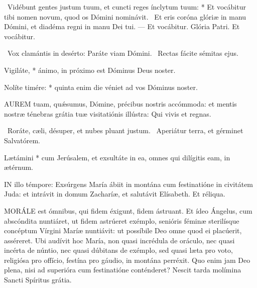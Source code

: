 \R\ Vidébunt gentes justum tuum, et cuncti reges ínclytum tuum: * Et vocábitur tibi nomen novum, quod os Dómini nominávit. \V\ Et eris coróna glóriæ in manu Dómini, et diadéma regni in manu Dei tui. --- Et vocábitur. Glória Patri. Et vocábitur.

\V\ Vox clamántis in desérto: Paráte viam Dómini. \R\ Rectas fácite sémitas ejus.

 Vigiláte, * ánimo, in próximo est Dóminus Deus noster.


 Nolíte timére: * quinta enim die véniet ad vos Dóminus noster.



\lettrine[lines=2]{A}{UREM} tuam, quǽsumus, Dómine, précibus nostris accómmoda: et mentis nostræ ténebras grátia tuæ visitatiónis illústra: Qui vivis et regnas.

\V\ Roráte, cæli, désuper, et nubes pluant justum. \R\ Aperiátur terra, et gérminet Salvatórem.

 Lætámini * cum Jerúsalem, et exsultáte in ea, omnes qui dilígitis eam, in ætérnum.


\sectionornament





\lettrine[lines=2]{I}{N} illo témpore: Exsúrgens María ábiit in montána cum festinatióne in civitátem Juda: et intrávit in domum Zacharíæ, et salutávit Elísabeth. Et réliqua.



\lettrine[lines=2]{M}{ORÁLE} est ómnibus, qui fidem éxigunt, fidem ástruant. Et ídeo Ángelus, cum abscóndita nuntiáret, ut fidem astrúeret exémplo, senióris féminæ sterilísque concéptum Vírgini Maríæ nuntiávit: ut possíbile Deo omne quod ei placúerit, asséreret. Ubi audívit hoc María, non quasi incrédula de oráculo, nec quasi incérta de núntio, nec quasi dúbitans de exémplo, sed quasi læta pro voto, religiósa pro offício, festína pro gáudio, in montána perréxit. Quo enim jam Deo plena, nisi ad superióra cum festinatióne conténderet? Nescit tarda molímina Sancti Spíritus grátia.


